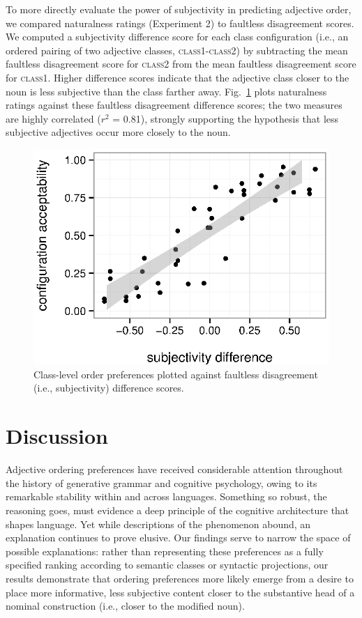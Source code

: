 \documentclass{pnastwo}
\begin{document}
\begin{article}
To more directly evaluate the power of subjectivity in predicting adjective order, we compared naturalness ratings (Experiment 2) to faultless disagreement scores. We  computed a subjectivity difference score for each class configuration (i.e., an ordered pairing of two adjective classes, \textsc{class1}-\textsc{class2}) by subtracting the mean faultless disagreement score for \textsc{class2} from the mean faultless disagreement score for \textsc{class1}. Higher difference scores indicate that the adjective class closer to the noun is less subjective than the class farther away. Fig.~\ref{faultless-order} plots naturalness ratings  against these faultless disagreement difference scores; the two measures are highly correlated ($r^2$ = 0.81), strongly supporting the hypothesis that less subjective adjectives occur more closely to the noun.

\begin{figure}[h]
	\centering
	\includegraphics[width=\linewidth]{plots/comparison2.eps}
	\caption{Class-level order preferences plotted against faultless disagreement (i.e., subjectivity) difference scores.}\label{faultless-order}
\end{figure}



\section{Discussion}

Adjective ordering preferences have received considerable attention throughout the history of generative grammar and cognitive psychology, owing to its remarkable stability within and across languages. Something so robust, the reasoning goes, must evidence a deep principle of the cognitive architecture that shapes language. Yet while descriptions of the phenomenon abound, an explanation continues to prove elusive. Our findings serve to narrow the space of possible explanations: rather than representing these preferences as a fully specified ranking according to semantic classes or syntactic projections, our results demonstrate that ordering preferences more likely emerge from a desire to place more informative, less subjective content closer to the substantive head of a nominal construction (i.e., closer to the modified noun).




\end{article}
\end{document}
